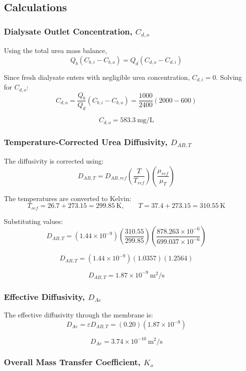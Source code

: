 \documentclass[10.5pt]{article}
\begin{document}
\subsection*{Calculations}

\subsubsection{Dialysate Outlet Concentration, $C_{d,o}$}

Using the total urea mass balance,
\[
    Q_b(C_{b,i}-C_{b,o}) = Q_d(C_{d,o}-C_{d,i})
\]

Since fresh dialysate enters with negligible urea concentration, $C_{d,i}=0$. Solving for $C_{d,o}$:
\[
    C_{d,o} = \frac{Q_b}{Q_d}(C_{b,i}-C_{b,o})
    = \frac{1000}{2400}(2000-600)
\]

\[
    \boxed{C_{d,o}=583.3 \ \text{mg/L}}
\]

\subsubsection{Temperature-Corrected Urea Diffusivity, $D_{AB,T}$}

The diffusivity is corrected using:
\[
    D_{AB,T}
    = D_{AB,ref}
    \left(\frac{T}{T_{ref}}\right)
    \left(\frac{\mu_{ref}}{\mu_T}\right)
\]

The temperatures are converted to Kelvin:
\[
    T_{ref}=26.7+273.15=299.85 \ \text{K},
    \qquad
    T=37.4+273.15=310.55 \ \text{K}
\]

Substituting values:
\[
    D_{AB,T}
    = (1.44 \times 10^{-9})
    \left(\frac{310.55}{299.85}\right)
    \left(\frac{878.263 \times 10^{-6}}{699.037 \times 10^{-6}}\right)
\]

\[
    D_{AB,T}
    = (1.44 \times 10^{-9})(1.0357)(1.2564)
\]

\[
    \boxed{D_{AB,T}=1.87 \times 10^{-9} \ \text{m}^2/\text{s}}
\]

\subsubsection{Effective Diffusivity, $D_{Ae}$}

The effective diffusivity through the membrane is:
\[
    D_{Ae} = \varepsilon D_{AB,T}
    = (0.20)(1.87 \times 10^{-9})
\]

\[
    \boxed{D_{Ae}=3.74 \times 10^{-10} \ \text{m}^2/\text{s}}
\]

\subsubsection{Overall Mass Transfer Coefficient, $K_o$}
\end{document}
